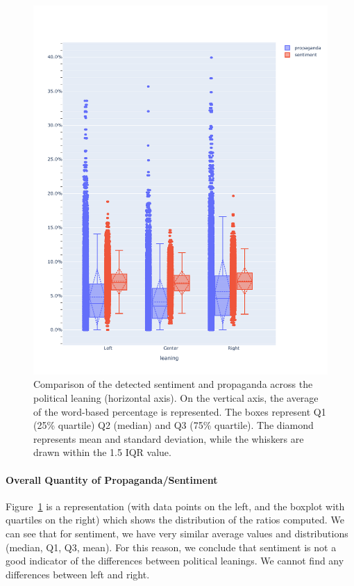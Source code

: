 \begin{figure}[!htbp]
    \centering
    \includegraphics[width=\linewidth]{figures/prop_sent_tech_across_leaning_headlines_mod.pdf} %
    \caption{Comparison of the detected sentiment and propaganda across the political leaning (horizontal axis). On the vertical axis, the average of the word-based percentage is represented. The boxes represent Q1 (25\% quartile) Q2 (median) and Q3 (75\% quartile). The diamond represents mean and standard deviation, while the whiskers are drawn within the 1.5 IQR value.}
    \label{fig:prop_sent_across_leaning}
\end{figure}

\paragraph{Overall Quantity of Propaganda/Sentiment}
Figure~\ref{fig:prop_sent_across_leaning} is a representation (with data points on the left, and the boxplot with quartiles on the right) which shows the distribution of the ratios computed. We can see that for sentiment, we have very similar average values and distributions (median, Q1, Q3, mean).
For this reason, we conclude that sentiment is not a good indicator of the differences between political leanings. We cannot find any differences between left and right.

